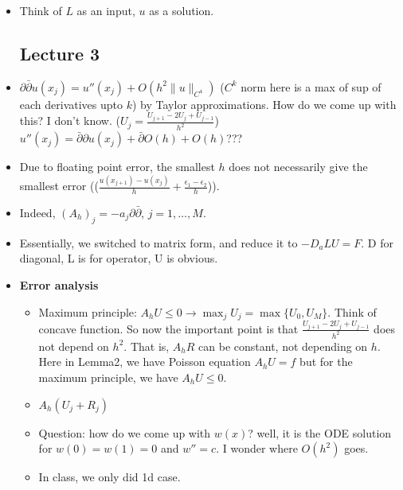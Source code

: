 \documentclass{article}
\newtheorem{theorem}{Theorem}
\theoremstyle{remark}
\newtheorem{example}{Example}
\begin{document}
\begin{itemize}
\begin{example}
If $A$ is symmetric, $\alpha=\lvert \lambda_n\rvert = \sigma_n$. Note that symmetric matrix is orthogonally diagonalizable;$A=V\Sigma V^T$, and eigenvalue can be negative.
\end{example}
Important note for symmetric positive definite matrix (\url{https://math.stackexchange.com/questions/1808799/positive-definite-if-and-only-if-determinants-are-positive}).
\begin{theorem}
Let $a$ be \textbf{positive definite symmetric} bounded bilinear form. Solution for $a(u,v)=L(v)$ exists iff $v=u$ minimizes $F(v)=\frac 12a(v,v)-L(v)$, $v\in H$.
\end{theorem}
\begin{theorem}
(Lax-Milgram)
There is uniqueness.
If $a$ is bounded, $\alpha-$coercive, bilinear form and $L$ is a bounded linear functional on $H$ then solution exists with some boundedness of $u$ by $L$ with coefficient $\alpha$.
\end{theorem}
\item Think of $L$ as an input, $u$ as a solution.

\subsection*{Lecture 3}
    \item $\partial\bar\partial u(x_j)=u''(x_j)+O(h^2\lVert u\rVert_{C^4})$ ($C^k$ norm here is a max of sup of each derivatives upto $k$) by Taylor approximations. How do we come up with this? I don't know. ($U_j=\frac{U_{j+1}-2U_j+U_{j-1}}{h^2}$)
    $u''(x_j)=\bar\partial\partial u(x_j)+\bar\partial O(h)+O(h)$???
    \item Due to floating point error, the smallest $h$ does not necessarily give the smallest error (($\frac{u(x_{j+1})-u(x_j)}{h}+\frac{\epsilon_1-\epsilon_2}{h}$)).
    
    \item Indeed, $(A_h)_j=-a_j\partial\bar\partial$, $j=1,\dots, M$.
    \item Essentially, we switched to matrix form, and reduce it to $-D_a LU=F$. D for diagonal, L is for operator, U is obvious.
    \item \textbf{Error analysis}
    \begin{itemize}
        \item Maximum principle: $A_hU\leq 0\to \max_j U_j=\max\{U_0,U_M\}$. Think of concave function. So now the important point is that $\frac {U_{j+1}-2U_j+U_{j-1}}{h^2}$ does not depend on $h^2$.  That is, $A_h R$ can be constant, not depending on $h$. Here in Lemma2, we have Poisson equation $A_h U=f$ but for the maximum principle, we have $A_h U\leq 0$.
        \item $A_h(U_j+R_j)$
        \item Question: how do we come up with $w(x)$? well, it is the ODE solution for $w(0)=w(1)=0$ and $w''=c$. I wonder where $O(h^2)$ goes.
        \item In class, we only did 1d case.
    \end{itemize}


\end{itemize}
\end{document}
